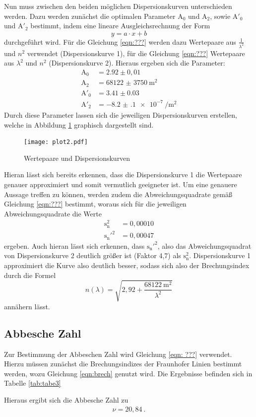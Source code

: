 Nun muss zwischen den beiden möglichen Dispersionskurven unterschieden werden.
Dazu werden zunächst die optimalen Parameter $\text{A}_0$ und $\text{A}_2$, sowie
$\text{A}'_0$ und $\text{A}'_2$
bestimmt, indem eine lineare Ausgleichsrechnung der Form
\begin{equation}
  y = a\cdot x +b
  \label{eqn:linear}
\end{equation}
durchgeführt wird. Für die Gleichung \ref{eqn:???} werden dazu Wertepaare aus $\frac{1}{\lambda^2}$
und $n^2$ verwendet (Dispersionskurve 1), für die Gleichung \ref{eqn:???} Wertepaare aus $\lambda^2$
und $n^2$ (Dispersionskurve 2).
Hieraus ergeben sich die Parameter:
\begin{align*}
  \text{A}_0 &= 2.92 \pm 0,01 \\
  \text{A}_2 &= \SI{68122(3750)}{\meter\squared} \\
  \text{A}'_0 &= 3.41 \pm 0.03 \\
  \text{A}'_2 &= \SI{-8.2(1)e-7}{\per\meter\squared}
\end{align*}
Durch diese Parameter lassen sich die jeweiligen Dispersionskurven erstellen, welche in Abbildung
\ref{fig:plot2} graphisch dargestellt sind.
\begin{figure}[H]
  \centering
  \texttt{[image: plot2.pdf]}
  \caption{Wertepaare und Dispersionskurven}
  \label{fig:plot2}
\end{figure}
Hieran lässt sich bereits erkennen, dass die Dispersionskurve 1 die Wertepaare genauer
approximiert und somit vermutlich geeigneter ist.
Um eine genauere Aussage treffen zu können, werden zudem die Abweichungsquadrate gemäß
Gleichung \ref{eqn:???} bestimmt, woraus sich für die jeweiligen Abweichungsquadrate
die Werte
\begin{align*}
  \text{s}_{\text{n}}^2 &= 0,00010 \\
  \text{s}_{\text{n}}'^2 &= 0,00047
\end{align*}
ergeben.
Auch hieran lässt sich erkennen, dass $\text{s}_{\text{n}}'^2$, also das Abweichungsquadrat
von Dispersionskurve 2 deutlich größer ist (Faktor 4,7) als $\text{s}_{\text{n}}^2$.
Dispersionskurve 1 approximiert die Kurve also deutlich besser, sodass sich also
der Brechungsindex durch die Formel
\begin{equation}
  n(\lambda) = \sqrt{2,92 + \frac{\SI{68122}{\meter\squared}}{{\lambda}^2}}
  \label{eqn:brech}
\end{equation}
annähern lässt.

\subsection{Abbesche Zahl}
Zur Bestimmung der Abbeschen Zahl wird Gleichung \ref{eqn: ???} verwendet.
Hierzu müssen zunächst die Brechungsindizes der Fraunhofer Linien bestimmt werden,
wozu Gleichung \ref{eqn:brech} genutzt wird. Die Ergebnisse befinden sich in Tabelle
\ref{tab:tabe3}

Hieraus ergibt sich die Abbesche Zahl zu
\begin{align}
  \nu = 20,84 \: .
\end{align}

